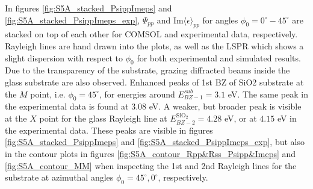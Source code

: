 In figures \ref{fig:S5A_stacked_PsippImeps} and \ref{fig:S5A_stacked_PsippImeps_exp}, $\Psi_{pp}$ and $\text{Im}\langle\epsilon\rangle_{pp}$ for angles $\phi_0=0^\circ-45^\circ$ are stacked on top of each other for COMSOL and experimental data, respectively. Rayleigh lines are hand drawn into the plots, as well as the LSPR which shows a slight dispersion with respect to $\phi_0$ for both experimental and simulated results. Due to the transparency of the substrate, grazing diffracted beams inside the glass substrate are also observed. Enhanced peaks of 1st BZ of SiO2 substrate at the $M$ point, i.e. $\phi_0=45^\circ$, for energies around $E_{BZ-1}^{sub}=3.1$ eV. The same peak in the experimental data is found at $3.08$ eV\cite{Brakstad:15}. A weaker, but broader peak is visible at the $X$ point for the glass Rayleigh line at $E_{BZ-2}^{\text{SiO}_2}=4.28$ eV, or at $4.15$ eV in the experimental data. These peaks are visible in figures \ref{fig:S5A_stacked_PsippImeps} and \ref{fig:S5A_stacked_PsippImeps_exp}, but also in the contour plots in figures \ref{fig:S5A_contour_Rpp&Rss_Psipp&Imeps} and \ref{fig:S5A_contour_MM} when inspecting the 1st and 2nd Rayleigh lines for the substrate at azimuthal angles $\phi_0=45^\circ, 0^\circ$, respectively.

